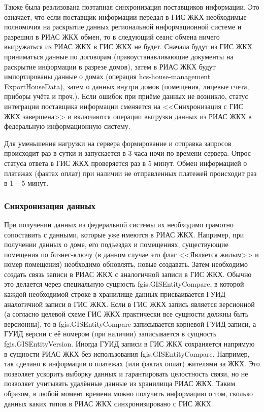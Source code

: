 Также была реализована поэтапная синхронизация поставщиков информации.
Это означает, что если поставщик информации передал в ГИС ЖКХ необходимые полномочия на раскрытие данных региональной информационной системе и разрешил в РИАС ЖКХ обмен, то в следующий сеанс обмена ничего выгружаться из РИАС ЖКХ в ГИС ЖКХ не будет.
Сначала будут из ГИС ЖКХ приниматься данные по договорам (правоустанавливающие документы на раскрытие информации в разрезе домов), затем в РИАС ЖКХ будут импортированы данные о домах (операция hcs-house-management\\ExportHouseData), затем о данных внутри домов (помещения, лицевые счета, приборы учёта и проч.).
Если ошибок при приёме данных не возникло, статус интеграции поставщика информации сменяется на <<Синхронизация с ГИС ЖКХ завершена>> и включаются операции выгрузки данных из РИАС ЖКХ в федеральную информационную систему.

Для уменьшения нагрузки на сервера формирование и отправка запросов происходит раз в сутки и запускается в 3 часа ночи по времени сервера.
Опрос статуса ответа в ГИС ЖКХ проверяется раз в 5 минут.
Обмен информацией о платежах (фактах оплат) при наличии не отправленных платежей происходит раз в 1 -- 5 минут.

\subsubsection{Синхронизация данных}

При получении данных из федеральной системы их необходимо грамотно сопоставить с данными, которые уже имеются в РИАС ЖКХ.
Например, при получении данных о доме, его подъездах и помещениях, существующие помещения по бизнес-ключу (в данном случае это флаг <<Является жилым>> и номер помещения) необходимо обновлять, новые создавать.
Затем необходимо создать связь записи в РИАС ЖКХ с аналогичной записи в ГИС ЖКХ.
Обычно это делается через специальную сущность fgis.GISEntityCompare, в которой каждой необходимой строке в хранилище данных присваивается ГУИД аналогичной записи в ГИС ЖКХ.
Если в ГИС ЖКХ запись является версионной (а согласно целевой схеме ГИС ЖКХ практически все сущности должны быть версионны), то в fgis.GISEntityCompare записывается корневой ГУИД записи, а ГУИД версии с её номером (при наличии) записывается в сущность fgis.GISEntityVersion.
Иногда ГУИД записи в ГИС ЖКХ сохраняется напрямую в сущности РИАС ЖКХ без использования fgis.GISEntityCompare.
Например, так сделано в информации о платежах (или фактах оплат) жителями за ЖКХ.
Это позволяет ускорить выборку данных и гарантировать целостность связи, но не позволяет учитывать удалённые данные из хранилища РИАС ЖКХ.
Таким образом, в любой момент времени можно получить информацию о том, сколько данных каких типов в РИАС ЖКХ синхронизировано с ГИС ЖКХ.

